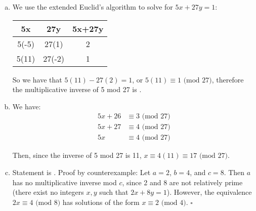 \begin{enumerate}
\begin{enumerate}[(a)]
        \item We use the extended Euclid's algorithm to solve for $5x+27y = 1$:
        
        \begin{tabular}{cc|c}
            5x & 27y & 5x+27y \\
            \hline
            5(-5) & 27(1) & 2 \\
            5(11) & 27(-2) & 1
        \end{tabular}
        
        So we have that $5(11)-27(2)=1$, or $5(11)\equiv1\text{ (mod 27)}$, therefore the multiplicative inverse of 5 mod 27 is .
        
        \item We have:
        \begin{align*}
            5x + 26 &\equiv 3 \text{ (mod 27)} \\
            5x + 27 &\equiv 4 \text{ (mod 27)} \\
            5x &\equiv 4 \text{ (mod 27)}
        \end{align*}
        
        Then, since the inverse of 5 mod 27 is 11, $x\equiv 4(11)\equiv \boxed{17 \text{ (mod 27)}}$.
        
        \item Statement is . Proof by counterexample: Let $a=2$, $b=4$, and $c=8$. Then $a$ has no multiplicative inverse mod $c$, since 2 and 8 are not relatively prime (there exist no integers $x,y$ such that $2x+8y=1$). However, the equivalence $2x\equiv 4\text{ (mod 8)}$ has solutions of the form $x\equiv 2\text{ (mod 4)}$. $\square$
    \end{enumerate}
    

\end{enumerate}
